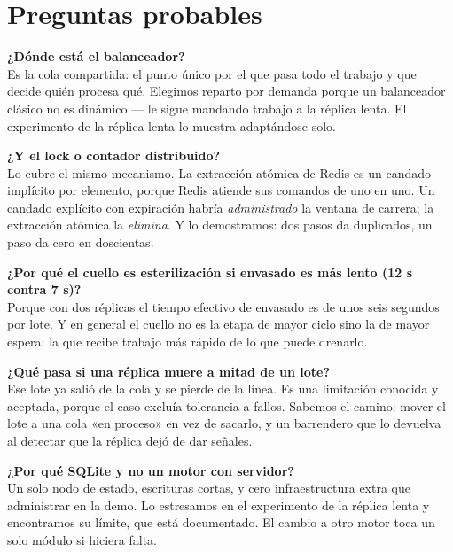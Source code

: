 \documentclass[11pt,a4paper]{article}
\begin{document}
\section{Preguntas probables}

\noindent\textbf{¿Dónde está el balanceador?}\\
Es la cola compartida: el punto único por el que pasa todo el trabajo y que
decide quién procesa qué. Elegimos reparto por demanda porque un balanceador
clásico no es dinámico --- le sigue mandando trabajo a la réplica lenta. El
experimento de la réplica lenta lo muestra adaptándose solo.

\vspace{8pt}
\noindent\textbf{¿Y el lock o contador distribuido?}\\
Lo cubre el mismo mecanismo. La extracción atómica de Redis es un candado
implícito por elemento, porque Redis atiende sus comandos de uno en uno. Un
candado explícito con expiración habría \emph{administrado} la ventana de
carrera; la extracción atómica la \emph{elimina}. Y lo demostramos: dos pasos
da duplicados, un paso da cero en doscientas.

\vspace{8pt}
\noindent\textbf{¿Por qué el cuello es esterilización si envasado es más lento
(12 s contra 7 s)?}\\
Porque con dos réplicas el tiempo efectivo de envasado es de unos seis segundos
por lote. Y en general el cuello no es la etapa de mayor ciclo sino la de mayor
espera: la que recibe trabajo más rápido de lo que puede drenarlo.

\vspace{8pt}
\noindent\textbf{¿Qué pasa si una réplica muere a mitad de un lote?}\\
Ese lote ya salió de la cola y se pierde de la línea. Es una limitación conocida
y aceptada, porque el caso excluía tolerancia a fallos. Sabemos el camino: mover
el lote a una cola «en proceso» en vez de sacarlo, y un barrendero que lo
devuelva al detectar que la réplica dejó de dar señales.

\vspace{8pt}
\noindent\textbf{¿Por qué SQLite y no un motor con servidor?}\\
Un solo nodo de estado, escrituras cortas, y cero infraestructura extra que
administrar en la demo. Lo estresamos en el experimento de la réplica lenta y
encontramos su límite, que está documentado. El cambio a otro motor toca un solo
módulo si hiciera falta.
\end{document}
